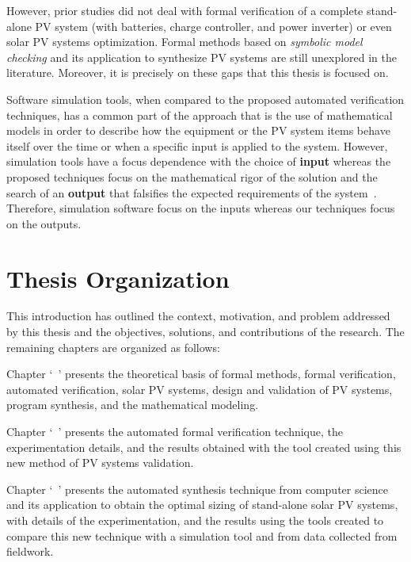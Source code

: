However, prior studies did not deal with formal verification of a complete stand-alone PV system (with batteries, charge controller, and power inverter) or even solar PV systems optimization. Formal methods based on \textit{symbolic model checking} and its application to synthesize PV systems are still unexplored in the literature. Moreover, it is precisely on these gaps that this thesis is focused on.

Software simulation tools, when compared to the proposed automated verification techniques, has a common part of the approach that is the use of mathematical models in order to describe how the equipment or the PV system items behave itself over the time or when a specific input is applied to the system. However, simulation tools have a focus dependence with the choice of  \textbf{input} whereas the proposed techniques focus on the mathematical rigor of the solution and the search of an \textbf{output} that falsifies the expected requirements of the system~\cite{ClarkeHV18}. Therefore, simulation software focus on the inputs whereas our techniques focus on the outputs.

\section{Thesis Organization}

This introduction has outlined the context, motivation, and problem addressed by this thesis and the objectives, solutions, and contributions of the research. The remaining chapters are organized as follows:

Chapter `~' presents the theoretical basis of formal methods, formal verification, automated verification, solar PV systems, design and validation of PV systems, program synthesis, and the mathematical modeling. 

Chapter `~' presents the automated formal verification technique, the experimentation details, and the results obtained with the tool created using this new method of PV systems validation. 

Chapter `~' presents the automated synthesis technique from computer science and its application to obtain the optimal sizing of stand-alone solar PV systems, with details of the experimentation, and the results using the tools created to compare this new technique with a simulation tool and from data collected from fieldwork. 

